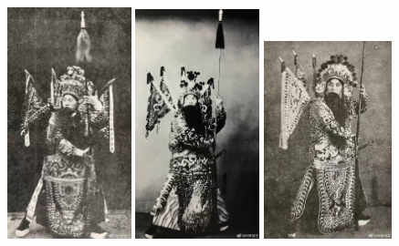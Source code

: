 \documentclass[cjk,slidestop,compress,mathserif,blue]{beamer}
\begin{document}
\frame
{
	\frametitle{}
\begin{figure}[h!]
\centering
\vspace{-0.15in}
\includegraphics[height=0.64\textwidth,width=0.32\textwidth,clip]{Figures_Peking-Opera/PekOpe_Liu-3.jpg}
\includegraphics[height=0.64\textwidth,width=0.32\textwidth,clip]{Figures_Peking-Opera/PekOpe_Liu-4.jpg}
\includegraphics[height=0.60\textwidth,width=0.33\textwidth,clip]{Figures_Peking-Opera/PekOpe_Liu-5.jpg}
\label{Liu_Zengfu-3}
\end{figure}
}
\end{document}
